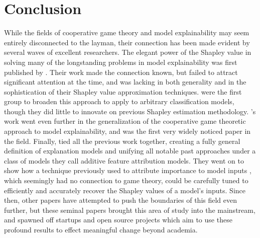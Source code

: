 \section{Conclusion}

While the fields of cooperative game theory and model explainability may seem entirely disconnected to the layman, their connection has been made evident by several waves of excellent researchers. The elegant power of the Shapley value in solving many of the longstanding problems in model explainability was first published by \citet{regressionInGameTheory_MS4}. Their work made the connection known, but failed to attract significant attention at the time, and was lacking in both generality and in the sophistication of their Shapley value approximation techniques. \citet{strumbelj_efficient_2010} were the first group to broaden this approach to apply to arbitrary classification models, though they did little to innovate on previous Shapley estimation methodology. \citet{QII_MS3}'s work went even further in the generalization of the cooperative game theoretic approach to model explainability, and was the first very widely noticed paper in the field.
Finally, \citet{microsoftPaper} tied all the previous work together, creating a fully general definition of explanation models and unifying all notable past approaches under a class of models they call additive feature attribution models. They went on to show how a technique previously used to attribute importance to model inputs \citep{ribeiroSG16_MS5}, which seemingly had no connection to game theory, could be carefully tuned to efficiently and accurately recover the Shapley values of a model's inputs. Since then, other papers have attempted to push the boundaries of this field even further, but these seminal papers brought this area of study into the mainstream, and spawned off startups \citep{QII_MS3} and open source projects \citep{microsoftPaper} which aim to use these profound results to effect meaningful change beyond academia.